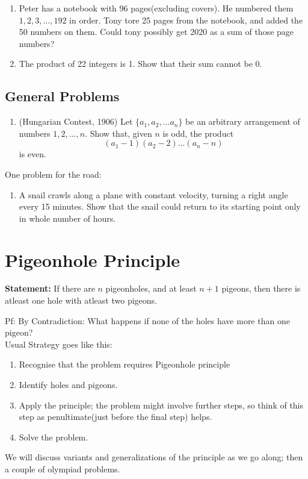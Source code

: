 \documentclass{amsart}
\begin{document}
\begin{enumerate}
\item Peter has a notebook with 96 pages(excluding covers). He numbered them $1,2,3,\ldots,192$ in order. Tony tore 25 pages from the notebook, and added the 50 numbers on them. Could tony possibly get 2020 as a sum of those page numbers?
\item The product of 22 integers is 1. Show that their sum cannot be 0.

\end{enumerate}

\subsection{General Problems}
\begin{enumerate}
\item (Hungarian Contest, 1906) Let $\{a_1,a_2,\ldots a_n\}$ be an arbitrary arrangement of numbers $1,2,\ldots,n$. Show that, given $n$ is odd, the product $$(a_1-1)(a_2-2)\ldots(a_n-n)$$
is even.
\end{enumerate}
One problem for the road:
\begin{enumerate}
\item A snail crawls along a plane with constant velocity, turning a right angle every 15 minutes. Show that the snail could return to its starting point only in whole number of hours.
\end{enumerate}


\section{Pigeonhole Principle}

\textbf{Statement:} If there are $n$ pigeonholes, and at least $n+1$ pigeons, then there is atleast one hole with atleast two pigeons.

Pf: By Contradiction: What happens if none of the holes have more than one pigeon?
\\

Usual Strategy goes like this:
\begin{enumerate}
\item Recognise that the problem requires Pigeonhole principle
\item Identify holes and pigeons.
\item Apply the principle; the problem might involve further steps, so think of this step as penultimate(just before the final step) helps.
\item Solve the problem.
\end{enumerate}
We will discuss variants and generalizations of the principle as we go along; then a couple of olympiad problems.
\end{document}
